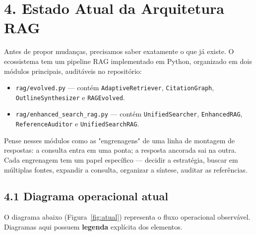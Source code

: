 
\section*{4. Estado Atual da Arquitetura RAG}

 Antes de propor mudanças, precisamos saber exatamente o que já existe.
O ecossistema tem um pipeline RAG implementado em Python, organizado em dois
módulos principais, auditáveis no repositório:

\begin{itemize}
  \item \texttt{rag/evolved.py} --- contém \texttt{AdaptiveRetriever},
        \texttt{CitationGraph}, \texttt{OutlineSynthesizer} e \texttt{RAGEvolved}.
  \item \texttt{rag/enhanced\_search\_rag.py} --- contém \texttt{UnifiedSearcher},
        \texttt{EnhancedRAG}, \texttt{ReferenceAuditor} e \texttt{UnifiedSearchRAG}.
\end{itemize}

\begin{intuicao}
Pense nesses módulos como as "engrenagens" de uma linha de montagem de respostas:
a consulta entra em uma ponta; a resposta ancorada sai na outra. Cada engrenagem
tem um papel específico --- decidir a estratégia, buscar em múltiplas fontes,
expandir a consulta, organizar a síntese, auditar as referências.
\end{intuicao}

\subsection*{4.1 Diagrama operacional atual}

 O diagrama abaixo (Figura~\ref{fig:atual}) representa o fluxo operacional
observável. Diagramas aqui possuem \textbf{legenda} explícita dos elementos.

